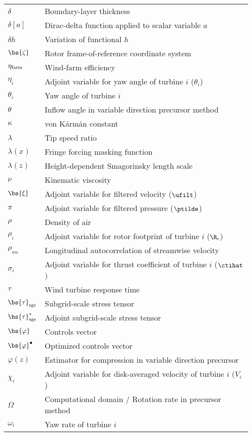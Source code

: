 \begin{tabular}{ p{2cm}  l }
	$\delta$         & Boundary-layer thickness\\
	$\delta[a]$      & Dirac-delta function applied to scalar variable $a$\\
	$\delta h$ 		 & Variation of functional $h$\\
	$\bs{\zeta}$     & Rotor frame-of-reference coordinate system\\
	$\eta_{\rm farm}$& Wind-farm efficiency\\
	$\eta_i$     	 &  Adjoint variable for yaw angle of turbine $i$ ($\theta_i$) \\	
	$\theta_i$       & Yaw angle of turbine $i$\\
	$\theta$         & Inflow angle in variable direction precursor method\\
    $\kappa$		 & von K\'arm\'an constant\\
	$\lambda$ 	     & Tip speed ratio\\
    $\lambda(x)$ 	 & Fringe forcing masking function\\
	$\lambda(z)$     & Height-dependent Smagorinsky length scale\\
	$\nu$ 			 & Kinematic viscosity\\
	$\bs{\xi}$ & Adjoint variable for filtered velocity ($\ufilt$)\\
	$\pi$ & Adjoint variable for filtered pressure ($\ptilde$)\\
	$\rho$      &  Density of air \\
	$\rho_i$    &  Adjoint variable for rotor footprint of turbine $i$ ($\R_i$)   \\
	$\rho_{uu}$ &  Longitudinal autocorrelation of streamwise velocity \\
	$\sigma_i$     	 &  Adjoint variable for thrust coefficient of turbine $i$ ($\ctihat$)  \\	
	$\tau$     &     Wind turbine response time\\	
	$\bs{\tau}_{\rm sgs}$     &  Subgrid-scale stress tensor   \\	
	$\bs{\tau}_{\rm sgs}^*$     &  Adjoint subgrid-scale stress tensor   \\	
	$\bs{\varphi}$     &  Controls vector \\
	$\bs{\varphi}^\bullet$     &  Optimized controls vector \\
	$\varphi(z)$ 	 & Estimator for compression in variable direction precursor\\
	$\chi_i$    &  Adjoint variable for disk-averaged velocity of turbine $i$ ($V_i$)   \\
	$\Omega$     &    Computational domain / Rotation rate in precursor method \\	
	$\omega_i$     &    Yaw rate of turbine $i$ \\	
\end{tabular}

